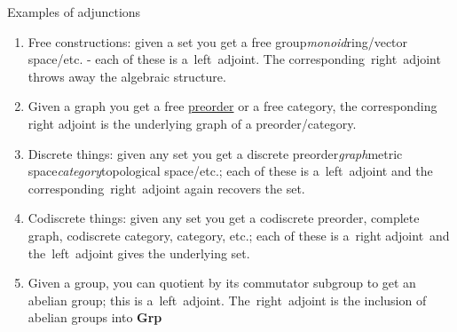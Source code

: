 Examples of adjunctions
\begin{enumerate}
  \item Free constructions: given a set you get a free group\emph{monoid}ring/vector space/etc. - each of these is a \,left\, adjoint. The corresponding \,right\, adjoint throws away the algebraic structure.
  \item Given a graph you get a free \hyperref[D1.30]{preorder} or a free category, the corresponding right adjoint is the underlying graph of a preorder/category.
  \item Discrete things: given any set you get a discrete preorder\emph{graph}metric space\emph{category}topological space/etc.; each of these is a \,left\, adjoint and the corresponding \,right\, adjoint again recovers the set.
  \item Codiscrete things: given any set you get a codiscrete preorder, complete graph, codiscrete category, category, etc.; each of these is a \,right adjoint\, and the \,left\, adjoint gives the underlying set.
  \item Given a group, you can quotient by its commutator subgroup to get an abelian group; this is a \,left\, adjoint. The \,right\, adjoint is the inclusion of abelian groups into \textbf{Grp}
\end{enumerate}